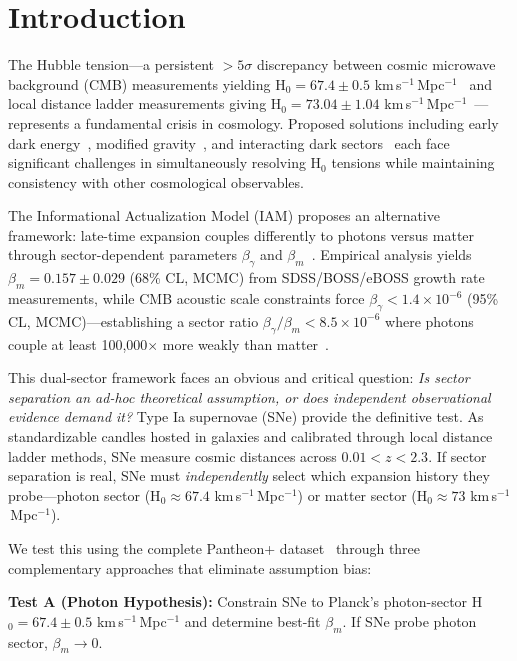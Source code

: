 \documentclass[twocolumn,superscriptaddress,prd,amsmath,amssymb]{revtex4-2}
\begin{document}
\section{Introduction}

The Hubble tension—a persistent $>5\sigma$ discrepancy between cosmic microwave background (CMB) measurements yielding H$_0 = 67.4 \pm 0.5$ km\,s$^{-1}$\,Mpc$^{-1}$~\cite{PlanckCollaboration2020} and local distance ladder measurements giving H$_0 = 73.04 \pm 1.04$ km\,s$^{-1}$\,Mpc$^{-1}$~\cite{Riess2022}—represents a fundamental crisis in cosmology. Proposed solutions including early dark energy~\cite{Kamionkowski2023}, modified gravity~\cite{Amendola2020}, and interacting dark sectors~\cite{DiValentino2021} each face significant challenges in simultaneously resolving H$_0$ tensions while maintaining consistency with other cosmological observables.

The Informational Actualization Model (IAM) proposes an alternative framework: late-time expansion couples differently to photons versus matter through sector-dependent parameters $\beta_\gamma$ and $\beta_m$~\cite{IAMManuscript2025}. Empirical analysis yields $\beta_m = 0.157 \pm 0.029$ (68\% CL, MCMC) from SDSS/BOSS/eBOSS growth rate measurements, while CMB acoustic scale constraints force $\beta_\gamma < 1.4 \times 10^{-6}$ (95\% CL, MCMC)—establishing a sector ratio $\beta_\gamma/\beta_m < 8.5 \times 10^{-6}$ where photons couple at least 100,000$\times$ more weakly than matter~\cite{IAMCompendium2025}.

This dual-sector framework faces an obvious and critical question: \textit{Is sector separation an ad-hoc theoretical assumption, or does independent observational evidence demand it?} Type Ia supernovae (SNe) provide the definitive test. As standardizable candles hosted in galaxies and calibrated through local distance ladder methods, SNe measure cosmic distances across $0.01 < z < 2.3$. If sector separation is real, SNe must \textit{independently} select which expansion history they probe—photon sector (H$_0 \approx 67.4$ km\,s$^{-1}$\,Mpc$^{-1}$) or matter sector (H$_0 \approx 73$ km\,s$^{-1}$\,Mpc$^{-1}$).

We test this using the complete Pantheon+ dataset~\cite{Brout2022} through three complementary approaches that eliminate assumption bias:

\textbf{Test A (Photon Hypothesis):} Constrain SNe to Planck's photon-sector H$_0 = 67.4 \pm 0.5$ km\,s$^{-1}$\,Mpc$^{-1}$ and determine best-fit $\beta_m$. If SNe probe photon sector, $\beta_m \to 0$.
\end{document}
